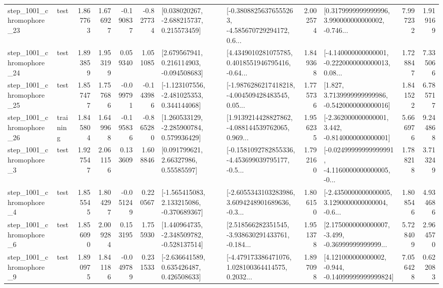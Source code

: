 \begin{tabular}{llrrrrllrlrr}
 step\_1001\_chromophore\_23 &      test &      1.867763 &    1.676927 &     -0.190837 & -0.827734 &    [0.038020267, -2.688215737, 0.215573459] &  [-0.38088256376555263, -4.585670729294172, 0.6... &       2.002574 &  [0.3179999999999996, 3.990000000000002, -0.746... &            7.997232 &          1.919169 \\
 step\_1001\_chromophore\_24 &      test &      1.893859 &    1.953199 &      0.059340 &  1.051085 &    [2.679567941, 0.216114903, -0.094508683] &  [4.4349010281075785, 0.4018551946795416, -0.64... &       1.849368 &  [-4.140000000000001, -0.2220000000000013, 0.08... &            1.728847 &          7.335066 \\
 step\_1001\_chromophore\_25 &      test &      1.857477 &    1.757686 &     -0.099791 & -0.143986 &   [-1.123107556, -2.481025353, 0.344144068] &  [-1.9876286217418218, -4.004509428483545, 0.05... &       1.775736 &   [1.827, 3.7139999999999986, -0.5420000000000016] &            1.841522 &          6.785717 \\
 step\_1001\_chromophore\_26 &  training &      1.845804 &    1.649968 &     -0.195836 & -0.865280 &    [1.260533129, -2.285900784, 0.579936429] &  [1.9139214428827862, -4.088144539762065, 0.969... &       1.956235 &   [-2.362000000000001, 3.442, -0.8140000000000001] &            5.666976 &          9.244868 \\
  step\_1001\_chromophore\_3 &      test &      1.927547 &    2.061156 &      0.133609 &  1.608846 &       [0.091799621, 2.66327986, 0.55585597] &  [-0.1581092782855336, -4.453699039795177, -0.5... &       1.792160 &  [-0.02499999999999991, -4.1160000000000005, -0... &            1.788218 &          3.713249 \\
  step\_1001\_chromophore\_4 &      test &      1.855545 &    1.804297 &     -0.051249 &  0.220567 &   [-1.565415083, 2.133215086, -0.370689367] &  [-2.6055343103283986, 3.6094248901689636, -0.3... &       1.806150 &  [-2.4350000000000005, 3.1290000000000004, -0.6... &            1.808546 &          4.934686 \\
  step\_1001\_chromophore\_6 &      test &      1.856090 &    2.009284 &      0.153195 &  1.755930 &   [1.440964735, -2.348509782, -0.528137514] &  [2.518566282351545, -3.938630291433761, -0.184... &       1.951378 &  [2.1750000000000007, -3.499, -0.36999999999999... &            5.728409 &          2.964570 \\
  step\_1001\_chromophore\_9 &      test &      1.890975 &    1.841186 &     -0.049789 &  0.231533 &    [-2.636641589, 0.635426487, 0.426508633] &  [-4.479173386471076, 1.028100364414575, 0.2032... &       1.897098 &  [4.121000000000002, -0.944, -0.14099999999999824] &            7.056428 &          0.622083 \\

\end{tabular}

